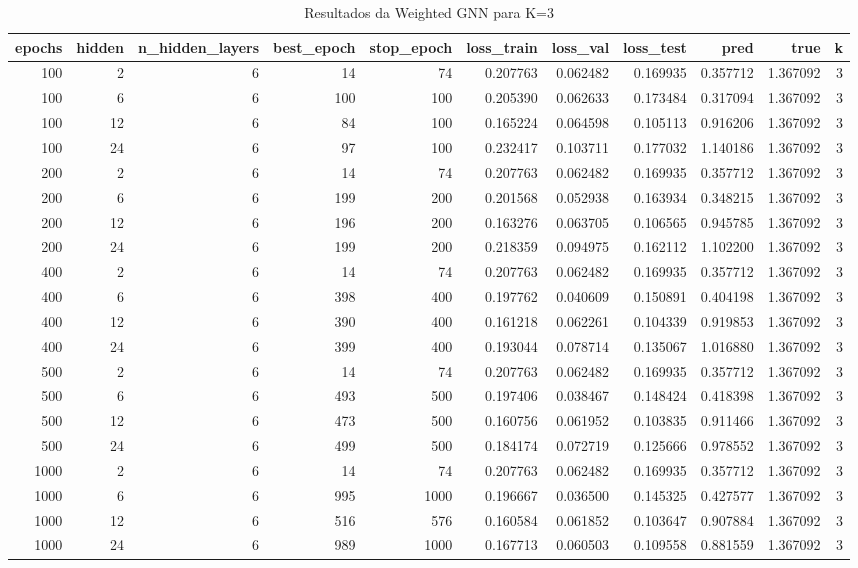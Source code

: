 \begin{table}
\caption{Resultados da Weighted GNN para K=3}
\label{tab:weighted_gnn_results_k3}
\begin{tabular}{rrrrrrrrrrr}
\toprule
epochs & hidden & n\_hidden\_layers & best\_epoch & stop\_epoch & loss\_train & loss\_val & loss\_test & pred & true & k \\
\midrule
100 & 2 & 6 & 14 & 74 & 0.207763 & 0.062482 & 0.169935 & 0.357712 & 1.367092 & 3 \\
100 & 6 & 6 & 100 & 100 & 0.205390 & 0.062633 & 0.173484 & 0.317094 & 1.367092 & 3 \\
100 & 12 & 6 & 84 & 100 & 0.165224 & 0.064598 & 0.105113 & 0.916206 & 1.367092 & 3 \\
100 & 24 & 6 & 97 & 100 & 0.232417 & 0.103711 & 0.177032 & 1.140186 & 1.367092 & 3 \\
200 & 2 & 6 & 14 & 74 & 0.207763 & 0.062482 & 0.169935 & 0.357712 & 1.367092 & 3 \\
200 & 6 & 6 & 199 & 200 & 0.201568 & 0.052938 & 0.163934 & 0.348215 & 1.367092 & 3 \\
200 & 12 & 6 & 196 & 200 & 0.163276 & 0.063705 & 0.106565 & 0.945785 & 1.367092 & 3 \\
200 & 24 & 6 & 199 & 200 & 0.218359 & 0.094975 & 0.162112 & 1.102200 & 1.367092 & 3 \\
400 & 2 & 6 & 14 & 74 & 0.207763 & 0.062482 & 0.169935 & 0.357712 & 1.367092 & 3 \\
400 & 6 & 6 & 398 & 400 & 0.197762 & 0.040609 & 0.150891 & 0.404198 & 1.367092 & 3 \\
400 & 12 & 6 & 390 & 400 & 0.161218 & 0.062261 & 0.104339 & 0.919853 & 1.367092 & 3 \\
400 & 24 & 6 & 399 & 400 & 0.193044 & 0.078714 & 0.135067 & 1.016880 & 1.367092 & 3 \\
500 & 2 & 6 & 14 & 74 & 0.207763 & 0.062482 & 0.169935 & 0.357712 & 1.367092 & 3 \\
500 & 6 & 6 & 493 & 500 & 0.197406 & 0.038467 & 0.148424 & 0.418398 & 1.367092 & 3 \\
500 & 12 & 6 & 473 & 500 & 0.160756 & 0.061952 & 0.103835 & 0.911466 & 1.367092 & 3 \\
500 & 24 & 6 & 499 & 500 & 0.184174 & 0.072719 & 0.125666 & 0.978552 & 1.367092 & 3 \\
1000 & 2 & 6 & 14 & 74 & 0.207763 & 0.062482 & 0.169935 & 0.357712 & 1.367092 & 3 \\
1000 & 6 & 6 & 995 & 1000 & 0.196667 & 0.036500 & 0.145325 & 0.427577 & 1.367092 & 3 \\
1000 & 12 & 6 & 516 & 576 & 0.160584 & 0.061852 & 0.103647 & 0.907884 & 1.367092 & 3 \\
1000 & 24 & 6 & 989 & 1000 & 0.167713 & 0.060503 & 0.109558 & 0.881559 & 1.367092 & 3 \\
\bottomrule
\end{tabular}
\end{table}
